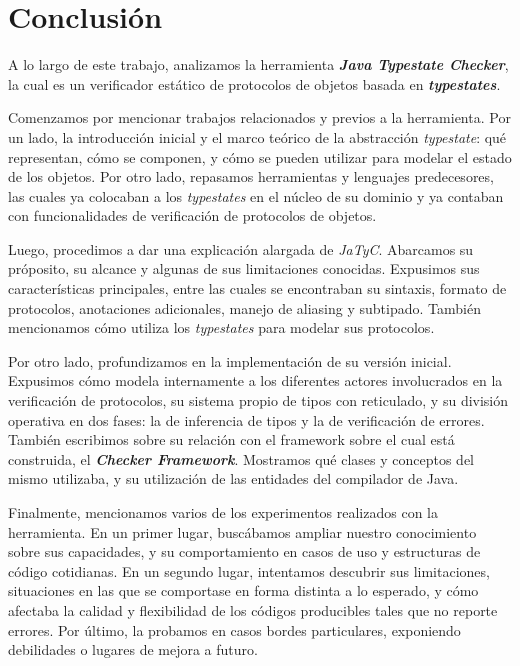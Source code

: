 \chapter{Conclusión}

A lo largo de este trabajo, analizamos la herramienta \textbf{\textit{Java Typestate Checker}}, la cual es un verificador estático de protocolos de objetos basada en \textbf{\textit{typestates}}.

Comenzamos por mencionar trabajos relacionados y previos a la herramienta. Por un lado, la introducción inicial y el marco teórico de la abstracción \textit{typestate}: qué representan, cómo se componen, y cómo se pueden utilizar para modelar el estado de los objetos. Por otro lado, repasamos herramientas y lenguajes predecesores, las cuales ya colocaban a los \textit{typestates} en el núcleo de su dominio y ya contaban con funcionalidades de verificación de protocolos de objetos.

Luego, procedimos a dar una explicación alargada de \textit{JaTyC}. Abarcamos su próposito, su alcance y algunas de sus limitaciones conocidas. Expusimos sus características principales, entre las cuales se encontraban su sintaxis, formato de protocolos, anotaciones adicionales, manejo de aliasing y subtipado. También mencionamos cómo utiliza los \textit{typestates} para modelar sus protocolos.

Por otro lado, profundizamos en la implementación de su versión inicial. Expusimos cómo modela internamente a los diferentes actores involucrados en la verificación de protocolos, su sistema propio de tipos con reticulado, y su división operativa en dos fases: la de inferencia de tipos y la de verificación de errores. También escribimos sobre su relación con el framework sobre el cual está construida, el \textbf{\textit{Checker Framework}}. Mostramos qué clases y conceptos del mismo utilizaba, y su utilización de las entidades del compilador de Java.

Finalmente, mencionamos varios de los experimentos realizados con la herramienta. En un primer lugar, buscábamos ampliar nuestro conocimiento sobre sus capacidades, y su comportamiento en casos de uso y estructuras de código cotidianas. En un segundo lugar, intentamos descubrir sus limitaciones, situaciones en las que se comportase en forma distinta a lo esperado, y cómo afectaba la calidad y flexibilidad de los códigos producibles tales que no reporte errores. Por último, la probamos en casos bordes particulares, exponiendo debilidades o lugares de mejora a futuro.


